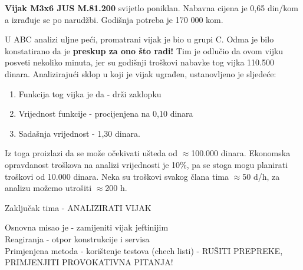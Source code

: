 \documentclass[a4paper,12pt]{article}
\numberwithin{figure}{section}
\begin{document}
\textbf{Vijak M3x6 JUS M.81.200} svijetlo poniklan. Nabavna cijena je 0,65 din/kom a izrađuje se po narudžbi. Godišnja potreba je 170 000 kom.
\begin{figure}
  \vspace{-20pt}
  \begin{center}
    
  \end{center}
  \vspace{-20pt}
  \vspace{-10pt}
\end{figure}
U ABC analizi uljne peći, promatrani vijak je bio u grupi C. Odma je bilo konstatirano da je \textbf{preskup za ono što radi!} Tim je odlučio da ovom vijku posveti nekoliko minuta, jer su godišnji troškovi nabavke tog vijka 110.500 dinara. Analizirajući sklop u koji je vijak ugrađen, ustanovljeno je sljedeće:
\begin{enumerate}
\item Funkcija tog vijka je da - drži zaklopku
\item Vrijednost funkcije - procijenjena na 0,10 dinara
\item Sadašnja vrijednost - 1,30 dinara.
\end{enumerate} 
Iz toga proizlazi da se može očekivati ušteda od $\approx$100.000 dinara. Ekonomska opravdanost troškova na analizi vrijednosti je 10\%, pa se stoga mogu planirati troškovi od 10.000 dinara. Neka su troškovi svakog člana tima $\approx$50 d/h, za analizu možemo utrošiti $\approx$200 h.
\begin{center}
Zaključak tima - ANALIZIRATI VIJAK
\end{center}
Osnovna misao je - zamijeniti vijak jeftinijim\\
Reagiranja - otpor konstrukcije i servisa\\
Primjenjena metoda - korištenje testova (chech listi) - RUŠITI PREPREKE, PRIMJENJITI PROVOKATIVNA PITANJA!
\end{document}
